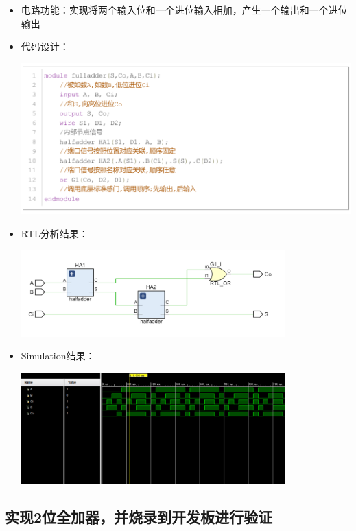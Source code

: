\documentclass[a4,10pt,zihao=-4]{ctexart}
\begin{document}
\begin{itemize}
\item
  电路功能：实现将两个输入位和一个进位输入相加，产生一个输出和一个进位输出
\item
  代码设计：
  
  \includegraphics[width=1\textwidth]{fulladder_Code.png}
\item

  RTL分析结果：
  
  \includegraphics[width=0.8\textwidth]{fulladder_RTL.png}
\item

  Simulation结果：
  
  \includegraphics[width=0.8\textwidth]{fulladder_Simulation.png}
\end{itemize}

\newpage
\subsection{实现2位全加器，并烧录到开发板进行验证}
\end{document}
